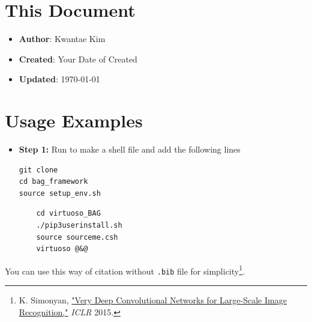 \documentclass[a4paper,12pt]{article}
\begin{document}
\section*{This Document}

\begin{itemize}
    \item \textbf{Author}: Kwantae Kim
    \item \textbf{Created}: Your Date of Created
    \item \textbf{Updated}: \today
\end{itemize}

\tableofcontents

\pagebreak
\section{Usage Examples}

\begin{itemize}
    \item[\footnotesize\faCode] \textbf{Step 1:} Run  to make a shell file and add the following lines
          \vspace{-1em}\begin{verbatim}
git clone
cd bag_framework
source setup_env.sh
        \end{verbatim}
          \vspace{-1em}\begin{verbatim}
    cd virtuoso_BAG
    ./pip3userinstall.sh
    source sourceme.csh
    virtuoso @&@
        \end{verbatim}
\end{itemize}

You can use this way of citation without \texttt{.bib} file for simplicity\footnote{K. Simonyan, \href{https://arxiv.org/abs/1409.1556}{"Very Deep Convolutional Networks for Large-Scale Image Recognition,"} \textit{ICLR} 2015.}.

\label{lastpage}        %
\end{document}
